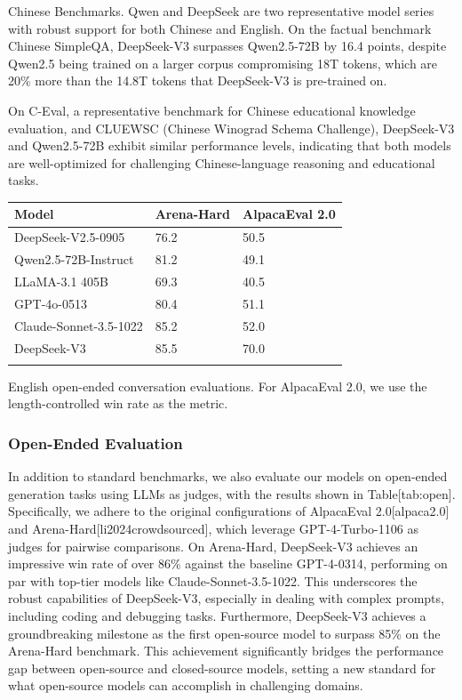 \documentclass[11pt,a4paper]{article}
\begin{document}
Chinese Benchmarks.
Qwen and DeepSeek are two representative model series with robust support for both Chinese and English. 
On the factual benchmark Chinese SimpleQA, DeepSeek-V3 surpasses Qwen2.5-72B by 16.4 points, despite Qwen2.5 being trained on a larger corpus compromising 18T tokens, which are 20\% more than the 14.8T tokens that DeepSeek-V3 is pre-trained on.

On C-Eval, a representative benchmark for Chinese educational knowledge evaluation, and CLUEWSC (Chinese Winograd Schema Challenge), DeepSeek-V3 and Qwen2.5-72B exhibit similar performance levels, indicating that both models are well-optimized for challenging Chinese-language reasoning and educational tasks.

\begin{table}[h]
\begin{tabular}{|l|l|l|}
\hline
Model & Arena-Hard & AlpacaEval 2.0 \\ \hline
DeepSeek-V2.5-0905 & 76.2 & 50.5 \\ \hline
Qwen2.5-72B-Instruct & 81.2 & 49.1 \\ \hline
LLaMA-3.1 405B & 69.3 & 40.5 \\ \hline
GPT-4o-0513 & 80.4 & 51.1 \\ \hline
Claude-Sonnet-3.5-1022 & 85.2 & 52.0 \\ \hline
DeepSeek-V3 & 85.5 & 70.0 \\ \hline
 &  &  \\ \hline
\end{tabular}
\end{table}

English open-ended conversation evaluations. 
 For AlpacaEval 2.0, we use the length-controlled win rate as the metric.

\subsubsection{Open-Ended Evaluation}

In addition to standard benchmarks, we also evaluate our models on open-ended generation tasks using LLMs as judges, with the results shown in Table[tab:open]. 
Specifically, we adhere to the original configurations of AlpacaEval 2.0[alpaca2.0] and Arena-Hard[li2024crowdsourced], which leverage GPT-4-Turbo-1106 as judges for pairwise comparisons. 
On Arena-Hard, DeepSeek-V3 achieves an impressive win rate of over 86\% against the baseline GPT-4-0314, performing on par with top-tier models like Claude-Sonnet-3.5-1022. 
This underscores the robust capabilities of DeepSeek-V3, especially in dealing with complex prompts, including coding and debugging tasks. 
Furthermore, DeepSeek-V3 achieves a groundbreaking milestone as the first open-source model to surpass 85\% on the Arena-Hard benchmark. 
This achievement significantly bridges the performance gap between open-source and closed-source models, setting a new standard for what open-source models can accomplish in challenging domains.
\end{document}
